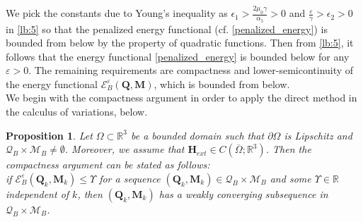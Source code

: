 \documentclass{article}
\newtheorem{proposition}[theorem]{Proposition}
\def\Qvec{\mathbf{Q}}
\def \Mvec{\mathbf{M}}
\def\Hvec{\mathbf{H}}
\begin{document}
We pick the constants due to Young's inequality as $\epsilon_1>\frac{2\mu_0\gamma}{\alpha_5}>0$ and $\frac{\varepsilon}{\gamma}>\epsilon_2>0$ in \eqref{lb:5} so that the penalized energy functional (cf. \eqref{penalized_energy}) is bounded from below by the property of quadratic functions. 
Then from \eqref{lb:5}, it follows that the energy functional \eqref{penalized_energy} is bounded below for any $\varepsilon>0$. The remaining requirements are compactness and lower-semicontinuity of the energy functional $\mathcal{E}^{\varepsilon}_B\left(\Qvec, \Mvec\right)$, which is bounded from below.\newline\\
We begin with the compactness argument in order to apply the direct method in the calculus of variations, below.
\begin{proposition}\label{prop:comp}
Let $\Omega\subset\mathbb R^3$ be a bounded domain such that $\partial\Omega$ is Lipschitz and $\mathcal{Q}_B\times\mathcal{M}_B\ne\emptyset$. Moreover, we assume that $\Hvec_{ext}\in C\left(\overline{\Omega}; \mathbb R^3\right)$. Then the compactness argument can be stated as follows:\\
if $\mathcal{E}^{\varepsilon}_B\left(\Qvec_k, \Mvec_k\right)\le\Upsilon$ for a sequence $\left(\Qvec_k, \Mvec_k\right)\in\mathcal{Q}_B\times\mathcal{M}_B$ and some $\Upsilon\in\mathbb R$ independent of $k$, then $\left(\Qvec_k, \Mvec_k\right)$ has a weakly converging subsequence in $\mathcal{Q}_B\times\mathcal{M}_B$.
\end{proposition}
\end{document}
